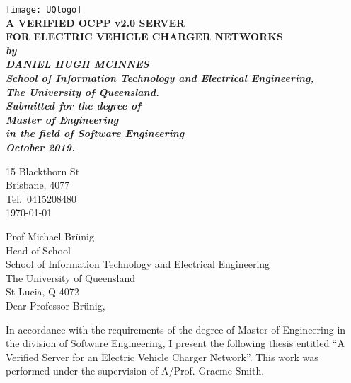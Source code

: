 \documentclass[12pt,openany,a4paper]{book}
\renewcommand{\baselinestretch}{1.2}	%
\begin{document}
\frontmatter

\begin{titlepage}
\renewcommand{\baselinestretch}{1.0}
\begin{center}
\texttt{[image: UQlogo]}\\
\vspace*{35mm}
\Huge\bf
		A VERIFIED OCPP v2.0 SERVER\\
		FOR ELECTRIC VEHICLE CHARGER NETWORKS\\
\vspace{20mm}
\large\sl
		by\\
		DANIEL HUGH MCINNES
		\medskip\\
\rm
		School of Information Technology and Electrical Engineering,\\
		The University of Queensland.\\
\vspace{30mm}
		Submitted for the degree of\\
		Master of Engineering
		\smallskip\\
\normalsize
		in the field of Software Engineering
		\medskip\\
\large
		October 2019.		
\end{center}
\end{titlepage}

\cleardoublepage

\begin{flushright}
	15 Blackthorn St\\
	Brisbane, 4077\\
	Tel.\ 0415208480\\
	\medskip
	\today
\end{flushright}
\begin{flushleft}
  Prof Michael Brünig\\
  Head of School\\
  School of Information Technology and Electrical Engineering\\
  The University of Queensland\\
  St Lucia, Q 4072\\
  \bigskip\bigskip
  Dear Professor Brünig,
\end{flushleft}

In accordance with the requirements of the degree of Master of
Engineering in the division of 
Software Engineering,
I present the
following thesis entitled ``A Verified Server for an Electric Vehicle Charger Network''.  This work was performed under the supervision of A/Prof. Graeme Smith.
\end{document}

